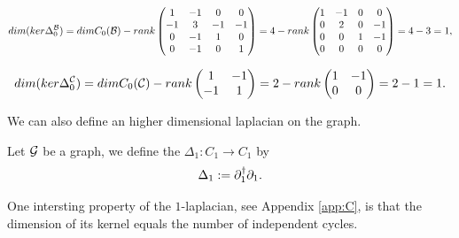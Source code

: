\documentclass[../2.tex]{subfiles}
\begin{document}
\begin{exa}
        \[ dim(ker\Delta_0^{\mathcal{B}}) =dimC_0(\mathcal{B}) - rank
        \begin{pmatrix}
            1 & -1 & 0 & 0  \\
            -1 & 3 & -1 & -1 \\
            0 & -1 & 1 & 0  \\
            0 & -1 & 0 & 1 
        \end{pmatrix} = 4 - rank
        \begin{pmatrix}
            1 & -1 & 0 & 0  \\
            0 & 2 & 0 & -1 \\
            0 & 0 & 1 & -1  \\
            0 & 0 & 0 & 0 
        \end{pmatrix} = 4 - 3 = 1,\]
        
        \[ dim(ker\Delta_0^{\mathcal{C}}) =dimC_0(\mathcal{C}) - rank
        \begin{pmatrix}
            1 & -1 \\
            -1 & 1
        \end{pmatrix} = 2 - rank
        \begin{pmatrix}
            1 & -1 \\
            0 & 0
        \end{pmatrix} = 2-1 = 1.\]
    \end{exa}

    We can also define an higher dimensional laplacian on the graph.

    \begin{defn}
        Let $\mathcal{G}$ be a graph, we define the  $\Delta_1 : C_1 \to C_1$ by 
        \[ \Delta_1 := \partial_1^\dagger \partial_1.\]
    \end{defn}

    One intersting property of the $1$-laplacian, see Appendix \ref{app:C}, is that the dimension of its kernel equals the number of independent cycles.
\end{document}
